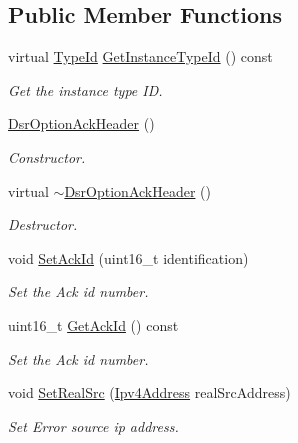 \subsection*{Public Member Functions}
\begin{DoxyCompactItemize}
\item 
virtual \hyperlink{classns3_1_1TypeId}{Type\+Id} \hyperlink{classns3_1_1dsr_1_1DsrOptionAckHeader_a70e991101abc98e52229efaebba19d82}{Get\+Instance\+Type\+Id} () const 
\begin{DoxyCompactList}\small\item\em Get the instance type ID. \end{DoxyCompactList}\item 
\hyperlink{classns3_1_1dsr_1_1DsrOptionAckHeader_a7b133cf7676ca687e248ca812776a151}{Dsr\+Option\+Ack\+Header} ()
\begin{DoxyCompactList}\small\item\em Constructor. \end{DoxyCompactList}\item 
virtual \hyperlink{classns3_1_1dsr_1_1DsrOptionAckHeader_a09298a732732a79c394bffefaa85c7f4}{$\sim$\+Dsr\+Option\+Ack\+Header} ()
\begin{DoxyCompactList}\small\item\em Destructor. \end{DoxyCompactList}\item 
void \hyperlink{classns3_1_1dsr_1_1DsrOptionAckHeader_a081c19d5e5c4d390f03205047fec0db7}{Set\+Ack\+Id} (uint16\+\_\+t identification)
\begin{DoxyCompactList}\small\item\em Set the Ack id number. \end{DoxyCompactList}\item 
uint16\+\_\+t \hyperlink{classns3_1_1dsr_1_1DsrOptionAckHeader_a6f675d54f56538666694a053c0b9546b}{Get\+Ack\+Id} () const 
\begin{DoxyCompactList}\small\item\em Set the Ack id number. \end{DoxyCompactList}\item 
void \hyperlink{classns3_1_1dsr_1_1DsrOptionAckHeader_a4c0aa9826576eb9ceb2ebdba5bcce673}{Set\+Real\+Src} (\hyperlink{classns3_1_1Ipv4Address}{Ipv4\+Address} real\+Src\+Address)
\begin{DoxyCompactList}\small\item\em Set Error source ip address. \end{DoxyCompactList}\item 

\end{DoxyCompactItemize}

